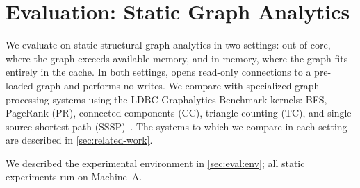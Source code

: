 \chapter{Evaluation: Static Graph Analytics}
\label{sec:eval:static}

We evaluate \project{} on static structural graph analytics in two settings: out-of-core, where the graph exceeds available memory, and in-memory, where the graph fits entirely in the \wt{} cache.
In both settings, \project{} opens read-only connections to a pre-loaded graph and performs no writes.
We compare \project{} with specialized graph processing systems using the LDBC Graphalytics Benchmark kernels: BFS, PageRank (PR), connected components (CC), triangle counting (TC), and single-source shortest path (SSSP)~\cite{LDBCGrapalytics22:online}.
The systems to which we compare in each setting are described in \autoref{sec:related-work}.


We described the experimental environment in \autoref{sec:eval:env}; all static experiments run on Machine~A.




